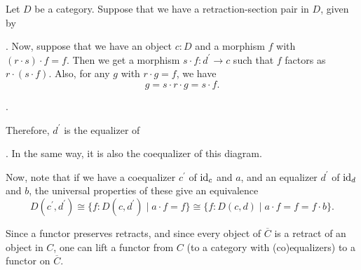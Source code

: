 \begin{remark}\label{rem:retract-coequalizer}
  Let $ D $ be a category. Suppose that we have a retraction-section pair in $ D $, given by
  .
  Now, suppose that we have an object $ c: D $ and a morphism $ f $ with $ (r \cdot s) \cdot f = f $. Then we get a morphism $ s \cdot f: d^\prime \to c $ such that $ f $ factors as $ r \cdot (s \cdot f) $. Also, for any $ g $ with $ r \cdot g = f $, we have
  \[ g = s \cdot r \cdot g = s \cdot f. \]
  \begin{center}
    .
  \end{center}
  Therefore, $ d^\prime $ is the equalizer of . In the same way, it is also the coequalizer of this diagram.

  Now, note that if we have a coequalizer $ c^\prime $ of $ \text{id}_{c} $ and $ a $, and an equalizer $ d^\prime $ of $ \text{id}_{d} $ and $ b $, the universal properties of these give an equivalence
  \[ D(c^\prime, d^\prime) \cong \{ f: D(c, d^\prime) \mid a \cdot f = f \} \cong \{ f: D(c, d) \mid a \cdot f = f = f \cdot b \}. \]
  \begin{center}
  \end{center}
\end{remark}

Since a functor preserves retracts, and since every object of $ \overline C $ is a retract of an object in $ C $, one can lift a functor from $ C $ (to a category with (co)equalizers) to a functor on $ \overline C $.

